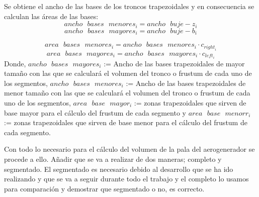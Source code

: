 \begin{definicion}
Se obtiene el ancho de las bases de los troncos trapezoidales y en consecuencia se calculan las áreas de las bases:
$$ ancho \text{ } bases \text{ } menores_i = ancho \text{ } buje - z_i $$
$$ ancho \text{ } bases \text{ } mayores_i = ancho \text{ } buje - b_i $$

$$ area \text{ } bases \text{ } menores_i = ancho \text{ } bases \text{ } menores_i \cdot c_{right}_i $$ 
$$ area \text{ } bases \text{ } mayores_i = ancho \text{ } bases \text{ } mayores_i \cdot c_{left}_i $$
Donde,
\centering $ancho \text{ } bases \text{ } mayores_i$ := Ancho de las bases trapezoidales de mayor tamaño con las que se calculará el volumen del tronco o frustum de cada uno de los segmentos,  $ancho \text{ } bases \text{ } menores_i$ := Ancho de las bases trapezoidales de menor tamaño con las que se calculará el volumen del tronco o frustum de cada uno de los segmentos, $ area \text{ } base \text{ } mayor_i $ := zonas trapezoidales que sirven de base mayor para el cálculo del frustum de cada segmento y $ area \text{ } base \text{ } menorr_i $ := zonas trapezoidales que sirven de base menor para el cálculo del frustum de cada segmento.
\label{def:area_bases}
\end{definicion}


Con todo lo necesario para el cálculo del volumen de la pala del aerogenerador se procede a ello. Añadir que se va a realizar de dos maneras; completo y segmentado. El segmentado es necesario debido al desarrollo que se ha ido realizando y que se va a seguir durante todo el trabajo y el completo lo usamos para comparación y demostrar que segmentado o no, es correcto.


